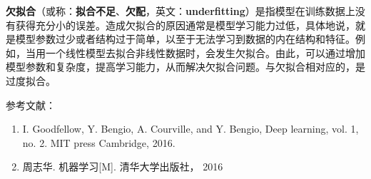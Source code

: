 
\textbf{欠拟合}（或称：\textbf{拟合不足}、\textbf{欠配}，英文：\textbf{underfitting}）是指模型在训练数据上没有获得充分小的误差。造成欠拟合的原因通常是模型学习能力过低，具体地说，就是模型参数过少或者结构过于简单，以至于无法学习到数据的内在结构和特征。例如，当用一个线性模型去拟合非线性数据时，会发生欠拟合。由此，可以通过增加模型参数和复杂度，提高学习能力，从而解决欠拟合问题。与欠拟合相对应的，是过度拟合。



参考文献：
\begin{enumerate}
\item I. Goodfellow, Y. Bengio, A. Courville, and Y. Bengio, Deep learning, vol. 1, no. 2. MIT press Cambridge, 2016.
\item 周志华. 机器学习[M]. 清华大学出版社， 2016
\end{enumerate}